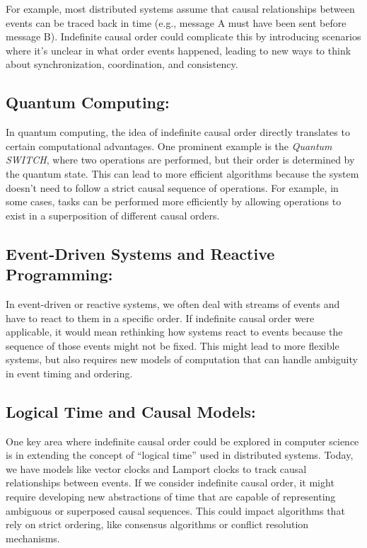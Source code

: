 \documentclass[../../../OAE-SPEC-MAIN.tex]{subfiles}
\begin{document}
For example, most distributed systems assume that causal relationships between events can be traced back in time (e.g., message A must have been sent before message B). Indefinite causal order could complicate this by introducing scenarios where it's unclear in what order events happened, leading to new ways to think about synchronization, coordination, and consistency.

\subsection*{Quantum Computing:}

In quantum computing, the idea of indefinite causal order directly translates to certain computational advantages. One prominent example is the \emph{Quantum SWITCH}, where two operations are performed, but their order is determined by the quantum state. This can lead to more efficient algorithms because the system doesn't need to follow a strict causal sequence of operations. For example, in some cases, tasks can be performed more efficiently by allowing operations to exist in a superposition of different causal orders.

\subsection*{Event-Driven Systems and Reactive Programming:}

In event-driven or reactive systems, we often deal with streams of events and have to react to them in a specific order. If indefinite causal order were applicable, it would mean rethinking how systems react to events because the sequence of those events might not be fixed. This might lead to more flexible systems, but also requires new models of computation that can handle ambiguity in event timing and ordering.

\subsection*{Logical Time and Causal Models:}

One key area where indefinite causal order could be explored in computer science is in extending the concept of ``logical time'' used in distributed systems. Today, we have models like vector clocks and Lamport clocks to track causal relationships between events. If we consider indefinite causal order, it might require developing new abstractions of time that are capable of representing ambiguous or superposed causal sequences. This could impact algorithms that rely on strict ordering, like consensus algorithms or conflict resolution mechanisms.
\end{document}
